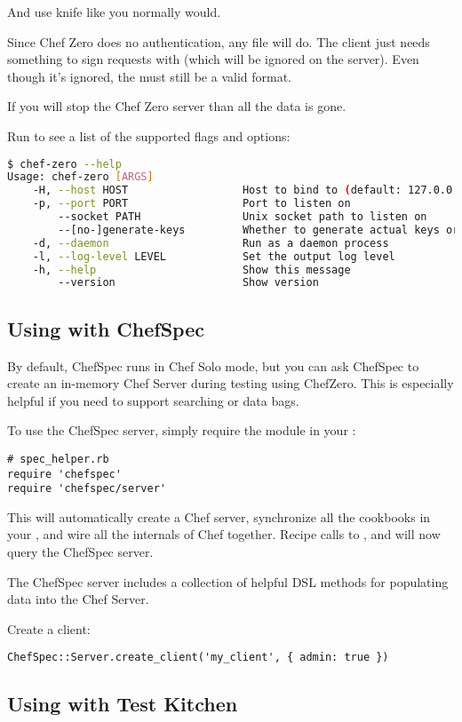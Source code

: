 And use knife like you normally would.

Since Chef Zero does no authentication, any  file will do. The client just needs something to sign requests with (which will be ignored on the server). Even though it's ignored, the  must still be a valid format.

If you will stop the Chef Zero server than all the data is gone.

Run  to see a list of the supported flags and options:

\begin{lstlisting}[language=Bash,label=lst:testing-chef-zero4]
$ chef-zero --help
Usage: chef-zero [ARGS]
    -H, --host HOST                  Host to bind to (default: 127.0.0.1)
    -p, --port PORT                  Port to listen on
        --socket PATH                Unix socket path to listen on
        --[no-]generate-keys         Whether to generate actual keys or fake it (faster).  Default: false.
    -d, --daemon                     Run as a daemon process
    -l, --log-level LEVEL            Set the output log level
    -h, --help                       Show this message
        --version                    Show version
\end{lstlisting}


\subsection{Using with ChefSpec}

By default, ChefSpec runs in Chef Solo mode, but you can ask ChefSpec to create an in-memory Chef Server during testing using ChefZero. This is especially helpful if you need to support searching or data bags.

To use the ChefSpec server, simply require the module in your :

\begin{lstlisting}[label=lst:testing-chef-zero5]
# spec_helper.rb
require 'chefspec'
require 'chefspec/server'
\end{lstlisting}

This will automatically create a Chef server, synchronize all the cookbooks in your , and wire all the internals of Chef together. Recipe calls to ,  and  will now query the ChefSpec server.

The ChefSpec server includes a collection of helpful DSL methods for populating data into the Chef Server.

Create a client:

\begin{lstlisting}[label=lst:testing-chef-zero6]
ChefSpec::Server.create_client('my_client', { admin: true })
\end{lstlisting}

\subsection{Using with Test Kitchen}
